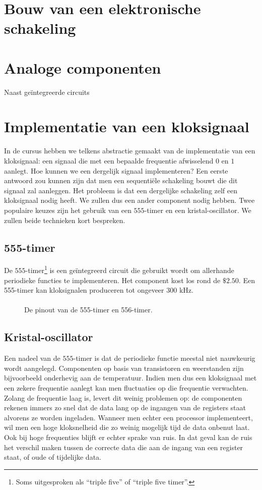 \section{Bouw van een elektronische schakeling}
\section{Analoge componenten}
Naast ge\"integreerde circuits 
\section{Implementatie van een kloksignaal}
In de cursus hebben we telkens abstractie gemaakt van de implementatie van een kloksignaal: een signaal die met een bepaalde frequentie afwisselend $0$ en $1$ aanlegt. Hoe kunnen we een dergelijk signaal implementeren? Een eerste antwoord zou kunnen zijn dat men een sequenti\"ele schakeling bouwt die dit signaal zal aanleggen. Het probleem is dat een dergelijke schakeling zelf een kloksignaal nodig heeft. We zullen dus een ander component nodig hebben. Twee populaire keuzes zijn het gebruik van een $555$-timer en een kristal-oscillator. We zullen beide technieken kort bespreken.
\subsection{555-timer}
De $555$-timer\footnote{Soms uitgesproken als ``triple five'' of ``triple five timer''.} is een ge\"integreerd circuit die gebruikt wordt om allerhande periodieke functies te implementeren. Het component kost los rond de $\$ 2.50$. Een 555-timer kan kloksignalen produceren tot ongeveer $300\mbox{ kHz}$.
\paragraph{}
\begin{figure}[hbt]
\centering
{}
\caption{De pinout van de 555-timer en 556-timer.}
\end{figure}
\subsection{Kristal-oscillator}
Een nadeel van de $555$-timer is dat de periodieke functie meestal niet nauwkeurig wordt aangelegd. Componenten op basis van transistoren en weerstanden zijn bijvoorbeeld onderhevig aan de temperatuur. Indien men dus een kloksignaal met een zekere frequentie aanlegt kan men fluctuaties op die frequentie verwachten. Zolang de frequentie laag is, levert dit weinig problemen op: de componenten rekenen immers zo snel dat de data lang op de ingangen van de registers staat alvorens ze worden ingeladen. Wanneer men echter een processor implementeert, wil men een hoge kloksnelheid die zo weinig mogelijk tijd de data onbenut laat. Ook bij hoge frequenties blijft er echter sprake van ruis. In dat geval kan de ruis het verschil maken tussen de correcte data die aan de ingang van een register staat, of oude of tijdelijke data.
